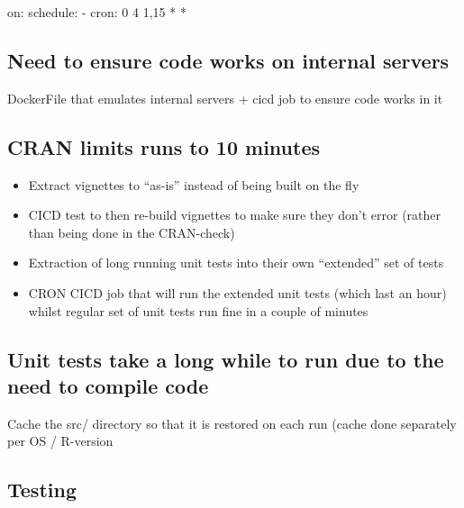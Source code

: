 \documentclass[
  letterpaper,
  DIV=11,
  numbers=noendperiod]{scrartcl}
\newenvironment{Shaded}{\begin{snugshade}}{\end{snugshade}}
\newcommand{\ExtensionTok}[1]{\textcolor[rgb]{0.00,0.23,0.31}{#1}}
\newcommand{\NormalTok}[1]{\textcolor[rgb]{0.00,0.23,0.31}{#1}}
\newcommand{\StringTok}[1]{\textcolor[rgb]{0.13,0.47,0.30}{#1}}
\providecommand{\tightlist}{%
  \setlength{\itemsep}{0pt}\setlength{\parskip}{0pt}}\usepackage{longtable,booktabs,array}
\begin{document}
\begin{Shaded}
\begin{Highlighting}[]
\ExtensionTok{on:}
  \ExtensionTok{schedule:}
    \ExtensionTok{{-}}\NormalTok{ cron: }\StringTok{\textquotesingle{}0 4 1,15 * *\textquotesingle{}}
\end{Highlighting}
\end{Shaded}

\hypertarget{need-to-ensure-code-works-on-internal-servers}{%
\subsection{Need to ensure code works on internal
servers}\label{need-to-ensure-code-works-on-internal-servers}}

DockerFile that emulates internal servers + cicd job to ensure code
works in it

\hypertarget{cran-limits-runs-to-10-minutes}{%
\subsection{CRAN limits runs to 10
minutes}\label{cran-limits-runs-to-10-minutes}}

\begin{itemize}
\tightlist
\item
  Extract vignettes to ``as-is'' instead of being built on the fly
\item
  CICD test to then re-build vignettes to make sure they don't error
  (rather than being done in the CRAN-check)
\item
  Extraction of long running unit tests into their own ``extended'' set
  of tests
\item
  CRON CICD job that will run the extended unit tests (which last an
  hour) whilst regular set of unit tests run fine in a couple of minutes
\end{itemize}

\hypertarget{unit-tests-take-a-long-while-to-run-due-to-the-need-to-compile-code}{%
\subsection{Unit tests take a long while to run due to the need to
compile
code}\label{unit-tests-take-a-long-while-to-run-due-to-the-need-to-compile-code}}

Cache the src/ directory so that it is restored on each run (cache done
separately per OS / R-version

\hypertarget{testing}{%
\subsection{Testing}\label{testing}}
\end{document}
